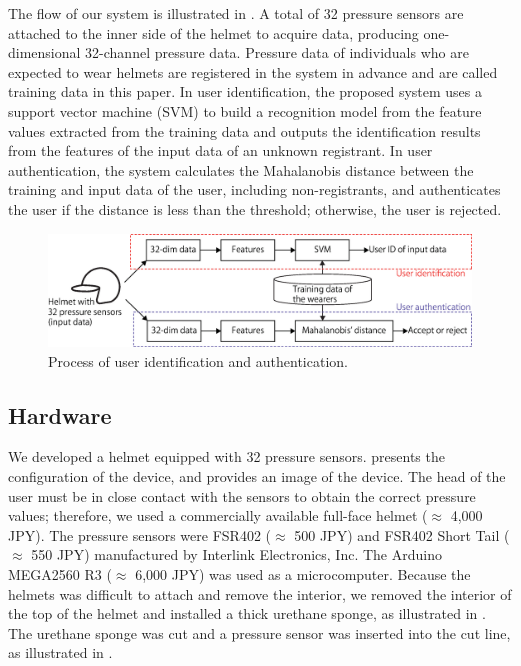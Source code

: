 \documentclass[english,preprint,JIP]{ipsj}
\begin{document}
The flow of our system is illustrated in . A total of 32 pressure sensors are attached to the inner side of the helmet to acquire data, producing one-dimensional 32-channel pressure data. Pressure data of individuals who are expected to wear helmets are registered in the system in advance and are called training data in this paper. In user identification, the proposed system uses a support vector machine (SVM) to build a recognition model from the feature values extracted from the training data and outputs the identification results from the features of the input data of an unknown registrant. In user authentication, the system calculates the Mahalanobis distance between the training and input data of the user, including non-registrants, and authenticates the user if the distance is less than the threshold; otherwise, the user is rejected.

\begin{figure}[!t]
  \centering
    \includegraphics[width=1\linewidth]{figure/system.eps}
  \caption{Process of user identification and authentication.}
  \label{fig:system}
\end{figure}



\subsection{Hardware}
We developed a helmet equipped with 32 pressure sensors.  presents the configuration of the device, and  provides an image of the device. The head of the user must be in close contact with the sensors to obtain the correct pressure values; therefore, we used a commercially available full-face helmet ($\approx$ 4,000 JPY). The pressure sensors were FSR402 ($\approx$ 500 JPY) and FSR402 Short Tail ($\approx$ 550 JPY) manufactured by Interlink Electronics, Inc. The Arduino MEGA2560 R3 ($\approx$ 6,000 JPY) was used as a microcomputer. Because the helmets was difficult to attach and remove the interior, we removed the interior of the top of the helmet and installed a thick urethane sponge, as illustrated in . The urethane sponge was cut and a pressure sensor was inserted into the cut line, as illustrated in .\par
\end{document}
